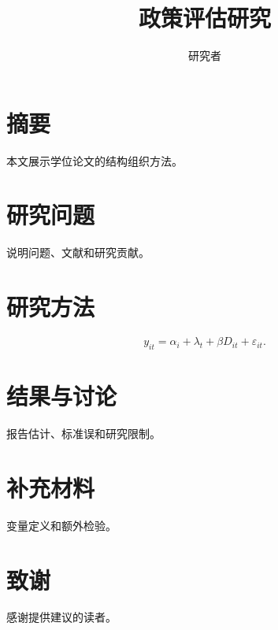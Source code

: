 \documentclass[fontset=fandol,openany]{ctexbook}
\begin{document}
\frontmatter
\title{政策评估研究}\author{研究者}\date{}\maketitle
\chapter{摘要}本文展示学位论文的结构组织方法。
\tableofcontents
\mainmatter
\chapter{研究问题}\label{ch:intro}说明问题、文献和研究贡献。
\chapter{研究方法}\[y_{it}=\alpha_i+\lambda_t+\beta D_{it}+\varepsilon_{it}.\]
\chapter{结果与讨论}报告估计、标准误和研究限制。
\appendix\chapter{补充材料}变量定义和额外检验。
\backmatter\chapter{致谢}感谢提供建议的读者。
\end{document}
